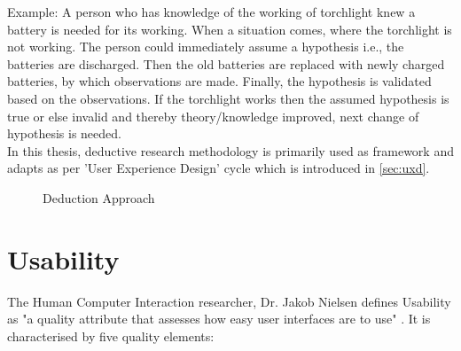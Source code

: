 Example: A person who has knowledge of the working of torchlight knew a battery is needed for its working. When a situation comes, where the torchlight is not working. The person could immediately assume a hypothesis i.e., the batteries are discharged. Then the old batteries are replaced with newly charged batteries, by which observations are made. Finally, the hypothesis is validated based on the observations. If the torchlight works then the assumed hypothesis is true or else invalid and thereby theory/knowledge improved, next change of hypothesis is needed. \\ 

In this thesis, deductive research methodology is primarily used as framework and adapts as per 'User Experience Design' cycle which is introduced in \ref{sec:uxd}. \\

\begin{figure}
	\centering
	
	
	\caption{Deduction Approach}
	\label{fig:DA}
\end{figure} 


\section{Usability}

The Human Computer Interaction researcher, Dr. Jakob Nielsen defines Usability as "a quality attribute that assesses how easy user interfaces are to use" \cite{usability-define}. It is characterised by five quality elements:

